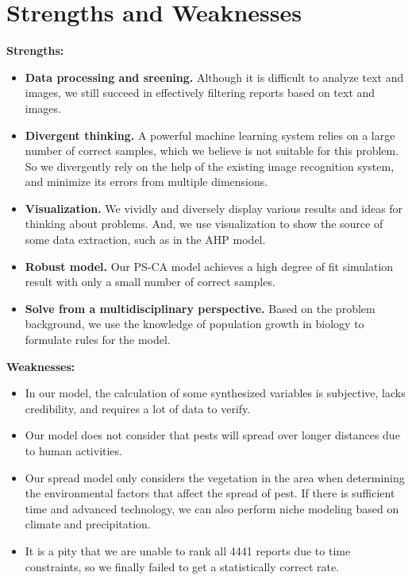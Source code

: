\section{Strengths and Weaknesses}
\begin{large}
\textbf{Strengths:}
\end{large}

\begin{itemize}
    \item \textbf {Data processing and sreening.} Although it is difficult to analyze text and images, we still succeed in effectively filtering reports based on text and images.
    \item \textbf {Divergent thinking.} A powerful machine learning system relies on a large number of correct samples, which we believe is not suitable for this problem. So we divergently rely on the help of the existing image recognition system, and minimize its errors from multiple dimensions.
    \item \textbf {Visualization.} We vividly and diversely display various results and ideas for thinking about problems. And, we use visualization to show the source of some data extraction, such as in the AHP model.
    \item \textbf {Robust model.} Our PS-CA model achieves a high degree of fit simulation result with only a small number of correct samples.
    \item \textbf {Solve from a multidisciplinary perspective.} Based on the problem background, we use the knowledge of population growth in biology to formulate rules for the model.
\end{itemize}

\begin{large}
\textbf{Weaknesses:}
\end{large}

\begin{itemize}
    \item In our model, the calculation of some synthesized variables is subjective, lacks credibility, and requires a lot of data to verify.
    \item Our model does not consider that pests will spread over longer distances due to human activities\parencite{simulation}.
    \item Our spread model only considers the vegetation in the area when determining the environmental factors that affect the spread of pest. If there is sufficient time and advanced technology, we can also perform niche modeling based on climate and precipitation.
    \item It is a pity that we are unable to rank all 4441 reports due to time constraints, so we finally failed to get a statistically correct rate.
\end{itemize}